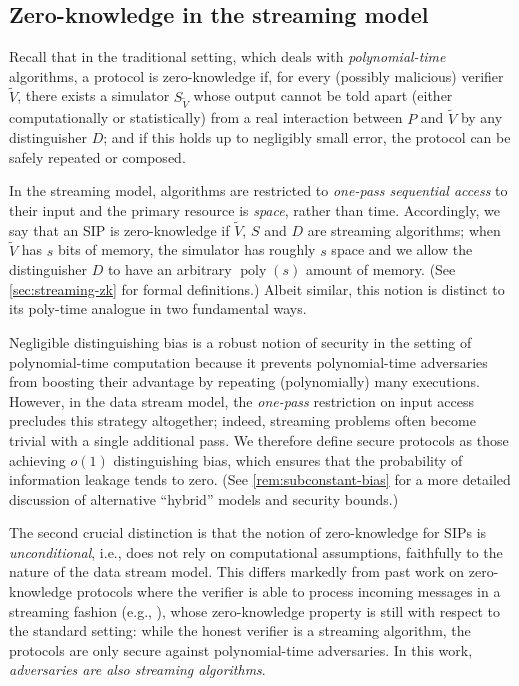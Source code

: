 \documentclass[a4paper,UKenglish,cleveref, autoref, thm-restate]{lipics-v2021}
\theoremstyle{definition}
\newcommand{\poly}{\operatorname{poly}}
\begin{document}
\subsection{Zero-knowledge in the streaming model}
Recall that in the traditional setting, which deals with \emph{polynomial-time} algorithms, a protocol is zero-knowledge if, for every (possibly malicious) verifier $\widetilde V$, there exists a simulator $S_{\widetilde V}$ whose output cannot be told apart (either computationally or statistically) from a real interaction between $P$ and $\widetilde V$ by any distinguisher $D$; and if this holds up to negligibly small error, the protocol can be safely repeated or composed.

In the streaming model, algorithms are restricted to \emph{one-pass sequential access} to their input and the primary resource is \emph{space}, rather than time. Accordingly, we say that an SIP is zero-knowledge if $\widetilde V$, $S$ and $D$ are streaming algorithms; when $\widetilde V$ has $s$ bits of memory, the simulator has roughly $s$ space and we allow the distinguisher $D$ to have an arbitrary $\poly(s)$ amount of memory. (See \cref{sec:streaming-zk} for formal definitions.) Albeit similar, this notion is distinct to its poly-time analogue in two fundamental ways.

Negligible distinguishing bias is a robust notion of security in the setting of polynomial-time computation because it prevents polynomial-time adversaries from boosting their advantage by repeating (polynomially) many executions. However, in the data stream model, the \emph{one-pass} restriction on input access precludes this strategy altogether; indeed, streaming problems often become trivial with a single additional pass. %
We therefore define secure protocols as those achieving $o(1)$ distinguishing bias, which ensures that the probability of information leakage tends to zero. (See \cref{rem:subconstant-bias} for a more detailed discussion of alternative ``hybrid'' models and security bounds.)

The second crucial distinction is that the notion of zero-knowledge for SIPs is \emph{unconditional}, i.e., does not rely on computational assumptions, faithfully to the nature of the data stream model. This differs markedly from past work on zero-knowledge protocols where the verifier is able to process incoming messages in a streaming fashion (e.g., \cite{GKR08,CMT12}), 
whose zero-knowledge property is still with respect to the standard setting: while the honest verifier is a streaming algorithm, the protocols are only secure against polynomial-time adversaries. In this work, \emph{adversaries are also streaming algorithms}.
\end{document}
